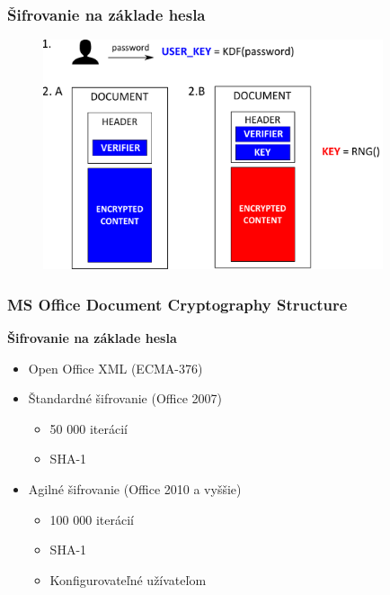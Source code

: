 \documentclass[xcolor=dvipsnames]{beamer}
\def\itemtitle#1{{\bfseries#1\smallskip}}
\begin{document}

\begin{frame}\frametitle{Šifrovanie na základe hesla}
	\begin{figure}[h]
		\centering
		\includegraphics[width=100mm]{images/password_encryption_schema.pdf} \\
		\vspace{-1mm}		
	\end{figure}
\end{frame}


\begin{frame}
	\frametitle{MS Office Document Cryptography Structure}
	\itemtitle{Šifrovanie na základe hesla}
	\begin{itemize}
		\item Open Office XML (ECMA-376)
		\item Štandardné šifrovanie (Office 2007)
		\begin{itemize}
			\item 50 000 iterácií
			\item SHA-1
		\end{itemize}
		\item Agilné šifrovanie (Office 2010 a vyššie)
		\begin{itemize}
			\item 100 000 iterácií
			\item SHA-1
			\item Konfigurovateľné užívateľom
		\end{itemize}
	\end{itemize}
\end{frame}

\end{document}
